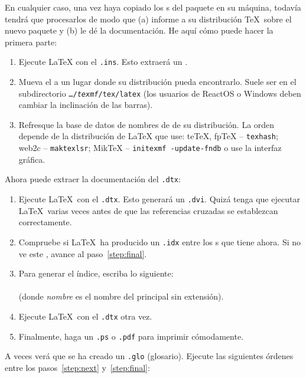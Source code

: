En cualquier caso, una vez haya copiado los \filenomo{}s del paquete en su máquina, todavía tendrá que procesarlos de modo que (a) informe a su distribución \TeX\ sobre el nuevo paquete y (b) le dé la documentación.  He aquí cómo puede hacer la primera parte:

\begin{enumerate}
    \item Ejecute \LaTeX{} con el \filenomo{} \texttt{.ins}.  Esto extraerá un  \filenomo{} .
    \item Mueva el \filenomo{}  a un lugar donde su distribución pueda encontrarlo.  Suele ser en el subdirectorio \texttt{\ldots/\emph{texmf}/tex/latex} (los usuarios de ReactOS o Windows deben cambiar la inclinación de las barras).
    \item Refresque la base de datos de nombres de \filenomo{} de su distribución.  La orden depende de la distribución de \LaTeX{} que use: te\TeX, fp\TeX{} -- \texttt{texhash}; web2c -- \texttt{maktexlsr}; MikTeX -- \texttt{initexmf -update-fndb} o use la interfaz gráfica.
\end{enumerate}

Ahora puede extraer la documentación del \filenomo{} \texttt{.dtx}:

\begin{enumerate}
    \item Ejecute \LaTeX\ con el \filenomo{} \texttt{.dtx}.  Esto generará un \filenomo{} \texttt{.dvi}.  Quizá tenga que ejecutar  \LaTeX\ varias veces antes de que las referencias cruzadas se establezcan correctamente.
    \item Compruebe si \LaTeX\ ha producido un \filenomo{} \texttt{.idx} entre los \filenomo{}s que tiene ahora.  Si no ve este \filenomo{}, avance al paso~\ref{step:final}.
    \item Para generar el índice, escriba lo siguiente:\\ \\ (donde \textit{nombre} es el nombre del \filenomo{} principal sin extensión).
     \item Ejecute \LaTeX\ con el \filenomo{} \texttt{.dtx} otra vez. \label{step:next}    
    \item Finalmente, haga un \filenomo{} \texttt{.ps} o \texttt{.pdf} para  imprimir cómodamente.\label{step:final}
\end{enumerate}

A veces verá que se ha creado un \filenomo{} \texttt{.glo} (glosario). Ejecute las siguientes órdenes entre los pasos~\ref{step:next} y~\ref{step:final}:

